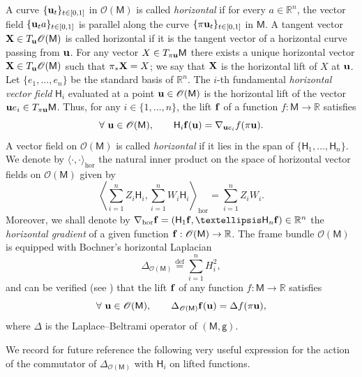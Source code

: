 \documentclass[a4paper,twoside,11pt,reqno]{amsart}
\newcommand{\eqdef}{\stackrel{\mathrm{def}}{=}}
\newcommand{\R}{\mathbb{R}} %
\newcommand{\li}{\bf }
\newcommand{\MM}{\mathsf{M}}
\newcommand{\GG}{\mathsf{g}}
\newcommand{\ms}{\mathscr}
\newcommand{\mr}{\mathrm}
\newcommand{\HH}{\mathsf{H}}
\begin{document}
A curve $\{ {\bf u}_t\}_{t\in[0,1]}$ in $\ms{O}(\MM)$ is called \emph{horizontal} if for every $a\in\R^n$, the vector field $\{ {\bf u}_ta \}_{t\in[0,1]}$ is parallel along the curve $\{ \pi {\bf u}_t\}_{t\in[0,1]}$ in $\MM$. A tangent vector ${\bf X}\in T_{{\bf u}}\ms{O}(\MM)$ is called horizontal if it is the tangent vector of a horizontal curve passing from ${\bf u}$. For any vector $X\in T_{\pi{\bf u}}\MM$ there exists a unique horizontal vector ${\bf X}\in T_{{\bf u}}\ms{O}(\MM)$ such that $\pi_\ast {\bf X} = X$; we say that ${\bf X}$ is the horizontal lift of $X$ at ${\bf u}$. Let $\{e_1,\ldots,e_n\}$ be the standard basis of $\R^n$. The $i$-th fundamental \emph{horizontal vector field} $\HH_i$ evaluated at a point ${\bf u}\in\ms{O}(\MM)$ is the horizontal lift of the vector ${\bf u}e_i \in T_{\pi{\bf u}}\MM$. Thus, for any $i\in\{1,\ldots,n\}$, the lift ${\li f}$ of a function $f:\MM\to\R$ satisfies
\begin{equation} \label{eq:laplacian-ident}
\forall \ {\bf u}\in\ms{O}(\MM),\qquad \HH_i {\li f}({\bf u}) = \nabla_{{\bf u}e_i} f(\pi {\bf u}).
\end{equation}
A vector field on $\ms{O}(\MM)$ is called \emph{horizontal} if it lies in the span of $\{\HH_1,\ldots,\HH_n\}$. We denote by $\langle\cdot,\cdot\rangle_{\mr{hor}}$ the natural inner product on the space of horizontal vector fields on $\ms{O}(\MM)$ given by
\begin{equation}
\left\langle \sum_{i=1}^n Z_i\HH_i, \sum_{i=1}^n W_i \HH_i \right\rangle_{\mr{hor}} = \sum_{i=1}^n Z_i W_i.
\end{equation} 
Moreover, we shall denote by $\nabla_{\mr{hor}}{\li f} = (\HH_1{\li f},\ldots\HH_n {\li f})\in\R^n$ the \emph{horizontal gradient} of a given function ${\li f}:\ms{O}(\MM)\to\R$. The frame bundle $\ms{O}(\MM)$ is equipped with Bochner’s horizontal Laplacian
\begin{equation}
\label{eq:Laplace_def}
\Delta_{\ms{O}(\MM)}\eqdef\sum_{i=1}^nH_i^2,
\end{equation}
and can be verified (see \cite[Proposition~3.1.2]{Hsu02}) that the lift $\li{f}$ of any function $f:\MM\to\R$ satisfies
\begin{equation} \label{eq:laplacian-ident}
\forall \ {\bf u}\in\ms{O}(\MM),\qquad \Delta_{\ms{O}(\MM)} {\li f}({\bf u}) = \Delta f(\pi {\bf u}),
\end{equation}
where $\Delta$ is the Laplace--Beltrami operator of $(\MM,\GG)$.

We record for future reference the following very useful expression for the action of the commutator of $\Delta_{\ms{O}(\MM)}$ with $\HH_i$ on lifted functions.
\end{document}
